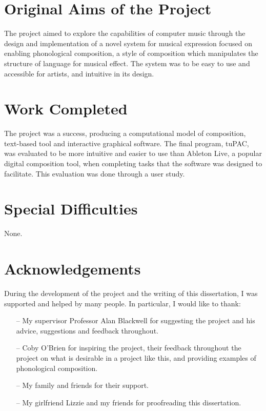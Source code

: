 \documentclass[12pt,a4paper,oneside,openright]{report}
\begin{document}
\section*{Original Aims of the Project}
The project aimed to explore the capabilities of computer music through the design and implementation of a novel system for musical expression focused on enabling phonological composition, a style of composition which manipulates the structure of language for musical effect. The system was to be easy to use and accessible for artists, and intuitive in its design.

\section*{Work Completed}
The project was a success, producing a computational model of composition, text-based tool and interactive graphical software. The final program, tuPAC, was evaluated to be more intuitive and easier to use than Ableton Live, a popular digital composition tool, when completing tasks that the software was designed to facilitate. This evaluation was done through a user study.

\section*{Special Difficulties}
None.

\newpage

\tableofcontents

\newpage
\section*{Acknowledgements}
During the development of the project and the writing of this dissertation, I was supported and helped by many people. In particular, I would like to thank:
\begin{itemize}
\item[--] My supervisor Professor Alan Blackwell for suggesting the project and his advice, suggestions and feedback throughout.
\item[--] Coby O'Brien for inspiring the project, their feedback throughout the project on what is desirable in a project like this, and providing examples of phonological composition.
\item[--] My family and friends for their support.
\item[--] My girlfriend Lizzie and my friends for proofreading this dissertation.
\end{itemize}
\end{document}
